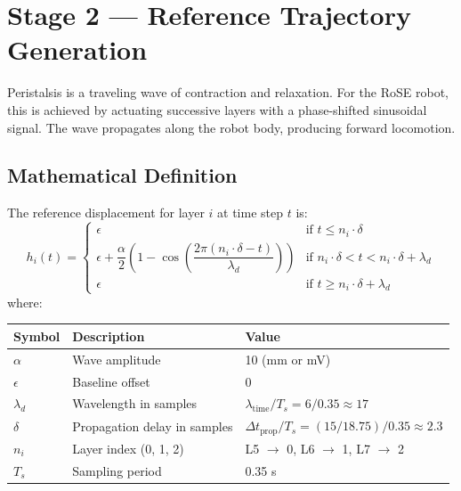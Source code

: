 \documentclass[11pt,a4paper]{article}
\begin{document}
\section{Stage 2 --- Reference Trajectory Generation}
\label{sec:trajectory}

\begin{conceptbox}
Peristalsis is a traveling wave of contraction and relaxation. For the RoSE robot,
this is achieved by actuating successive layers with a phase-shifted sinusoidal
signal. The wave propagates along the robot body, producing forward locomotion.
\end{conceptbox}

\subsection{Mathematical Definition}

\begin{equationbox}
The reference displacement for layer $i$ at time step $t$ is:
\begin{equation}
    h_i(t) = \begin{cases}
        \epsilon & \text{if } t \leq n_i \cdot \delta \\[6pt]
        \epsilon + \dfrac{\alpha}{2}\left(1 - \cos\!\left(\dfrac{2\pi(n_i \cdot \delta - t)}{\lambda_d}\right)\right) & \text{if } n_i \cdot \delta < t < n_i \cdot \delta + \lambda_d \\[6pt]
        \epsilon & \text{if } t \geq n_i \cdot \delta + \lambda_d
    \end{cases}
    \label{eq:peristaltic_ref}
\end{equation}
where:
\begin{center}
\begin{tabular}{lll}
\toprule
\textbf{Symbol} & \textbf{Description} & \textbf{Value} \\
\midrule
$\alpha$ & Wave amplitude & 10 (mm or mV) \\
$\epsilon$ & Baseline offset & 0 \\
$\lambda_d$ & Wavelength in samples & $\lambda_{\text{time}} / T_s = 6 / 0.35 \approx 17$ \\
$\delta$ & Propagation delay in samples & $\Delta t_{\text{prop}} / T_s = (15/18.75) / 0.35 \approx 2.3$ \\
$n_i$ & Layer index (0, 1, 2) & L5 $\to$ 0, L6 $\to$ 1, L7 $\to$ 2 \\
$T_s$ & Sampling period & 0.35 s \\
\bottomrule
\end{tabular}
\end{center}
\end{equationbox}
\end{document}
